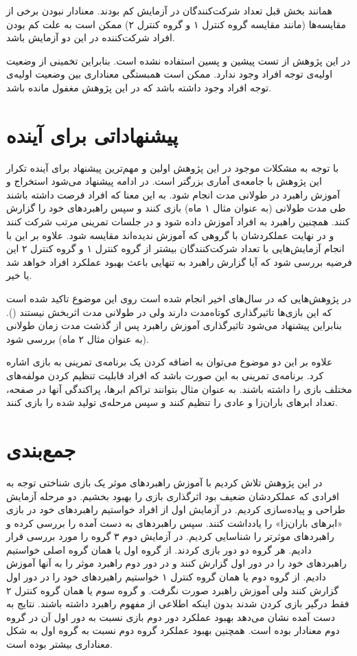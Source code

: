 \documentclass[twoside, a4paper,11pt]{book}
\numberwithin{equation}{chapter}
\numberwithin{table}{chapter}
\numberwithin{figure}{chapter}
\numberwithin{equation}{chapter}
\begin{document}
همانند بخش قبل تعداد شرکت‌کنندگان در آزمایش کم بودند. معنادار نبودن برخی از مقایسه‌ها (مانند مقایسه گروه کنترل ۱ و گروه کنترل ۲) ممکن است به علت کم بودن افراد شرکت‌کننده در این دو آزمایش باشد.

در این پژوهش از تست پیشین و پسین استفاده نشده است. بنابراین تخمینی از وضعیت اولیه‌ی توجه افراد وجود ندارد. ممکن است همبستگی معناداری بین وضعیت اولیه‌ی توجه افراد وجود داشته باشد که در این پژوهش مغفول مانده باشد.

\section{پیشنهاداتی برای آینده}

با توجه به مشکلات موجود در این پژوهش اولین و مهم‌ترین پیشنهاد برای آینده تکرار این پژوهش با جامعه‌ی آماری بزرگتر است. در ادامه پیشنهاد می‌شود استخراج و آموزش راهبرد در طولانی مدت انجام شود. به این معنا که افراد فرصت داشته باشند طی مدت طولانی (به عنوان مثال ۱ ماه) بازی کنند و سپس راهبردهای خود را گزارش کنند. همچنین راهبرد به افراد آموزش داده شود و در جلسات تمرینی مرتب شرکت کنند و در نهایت عملکردشان با گروهی که آموزش ندیده‌اند مقایسه شود. علاوه بر این با انجام آزمایش‌هایی با تعداد شرکت‌کنندگان بیشتر از گروه کنترل ۱ و گروه کنترل ۲ این فرضیه بررسی شود که آیا گزارش راهبرد به تنهایی باعث بهبود عملکرد افراد خواهد شد یا خیر.

در پژوهش‌هایی که در سال‌های اخیر انجام شده است روی این موضوع تاکید شده است که این بازی‌ها تاثیرگذاری کوتاه‌مدت دارند ولی در طولانی مدت اثربخش نیستند (\cite{melby2013WM}). بنابراین پیشنهاد می‌شود تاثیرگذاری آموزش راهبرد پس از گذشت مدت زمان طولانی (به عنوان مثال ۲ ماه) بررسی شود.

علاوه بر این دو موضوع می‌توان به اضافه کردن یک برنامه‌ی تمرینی به بازی اشاره کرد. برنامه‌ی تمرینی به این صورت باشد که افراد قابلیت تنظیم کردن مولفه‌های مختلف بازی را داشته باشند. به عنوان مثال بتوانند تراکم ابرها، پراکندگی آنها در صفحه، تعداد ابرهای باران‌زا و عادی را تنظیم کنند و سپس مرحله‌ی تولید شده را بازی کنند.


\section{جمع‌بندی}
در این پژوهش تلاش کردیم با آموزش راهبردهای موثر یک بازی شناختی توجه به افرادی که عملکردشان ضعیف بود اثرگذاری بازی را بهبود بخشیم. دو مرحله آزمایش طراحی و پیاده‌سازی کردیم. در آزمایش اول از افراد خواستیم راهبردهای خود در بازی «ابرهای باران‌زا» را یادداشت کنند. سپس راهبردهای به دست آمده را بررسی کرده و راهبردهای موثرتر را شناسایی کردیم. در آزمایش دوم ۳ گروه را مورد بررسی قرار دادیم. هر گروه دو دور بازی کردند. از گروه اول یا همان گروه اصلی خواستیم راهبردهای خود را در دور اول گزارش کنند و در دور دوم راهبرد موثر را به آنها آموزش دادیم. از گروه دوم یا همان گروه کنترل ۱ خواستیم راهبردهای خود را در دور اول گزارش کنند ولی آموزش راهبرد صورت نگرفت. و گروه سوم یا همان گروه کنترل ۲ فقط درگیر بازی کردن شدند بدون اینکه اطلاعی از مفهوم راهبرد داشته باشند. نتایج به دست آمده نشان می‌دهد بهبود عملکرد دور دوم بازی نسبت به دور اول آن در گروه دوم معنادار بوده است. همچنین بهبود عملکرد گروه دوم نسبت به گروه اول به شکل معناداری بیشتر بوده است.
\end{document}

